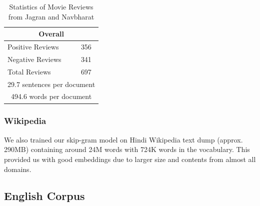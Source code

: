 \documentclass[11pt,a4paper]{article}
\begin{document}
\begin {table}[h!]
\large
\centering
\begin{tabular}{ |l|l| }
\hline
\multicolumn{2}{|c|}{\textbf{Overall}} \\
\hline
Positive Reviews & 356 \\ 
Negative Reviews & 341 \\
Total Reviews & 697\\ \hline
\multicolumn{2}{|c|}{29.7 sentences per document} \\ \hline
\multicolumn{2}{|c|}{494.6 words per document} \\
\hline
\end{tabular}
\caption {Statistics of Movie Reviews from Jagran and Navbharat}
\end{table}
\subsubsection{Wikipedia}
We also trained our skip-gram model on Hindi Wikipedia text dump (approx. 290MB) containing around 24M words with 724K words in the vocabulary. This provided us with good embeddings due to larger size and contents from almost all domains.

\subsection{English Corpus}
\label{english_corpus}
\end{document}
